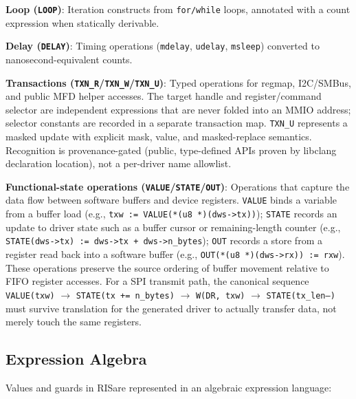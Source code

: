 \documentclass[sigplan, screen, review, anonymous]{acmart}
\newcommand{\rislang}{RIS}
\begin{document}
\textbf{Loop (\texttt{LOOP})}: Iteration constructs from \texttt{for/while} loops, annotated with a count expression when statically derivable.

\textbf{Delay (\texttt{DELAY})}: Timing operations (\texttt{mdelay}, \texttt{udelay}, \texttt{msleep}) converted to nanosecond-equivalent counts.

\textbf{Transactions (\texttt{TXN\_R}/\texttt{TXN\_W}/\texttt{TXN\_U})}: Typed operations for regmap, I2C/SMBus, and public MFD helper accesses. The target handle and register/command selector are independent expressions that are never folded into an MMIO address; selector constants are recorded in a separate transaction map. \texttt{TXN\_U} represents a masked update with explicit mask, value, and masked-replace semantics. Recognition is provenance-gated (public, type-defined APIs proven by libclang declaration location), not a per-driver name allowlist.

\textbf{Functional-state operations (\texttt{VALUE}/\texttt{STATE}/\texttt{OUT})}: Operations that capture the data flow between software buffers and device registers. \texttt{VALUE} binds a variable from a buffer load (e.g., \texttt{txw := VALUE(*(u8 *)(dws->tx))}); \texttt{STATE} records an update to driver state such as a buffer cursor or remaining-length counter (e.g., \texttt{STATE(dws->tx) := dws->tx + dws->n\_bytes}); \texttt{OUT} records a store from a register read back into a software buffer (e.g., \texttt{OUT(*(u8 *)(dws->rx)) := rxw}). These operations preserve the source ordering of buffer movement relative to FIFO register accesses. For a SPI transmit path, the canonical sequence \texttt{VALUE(txw)} $\rightarrow$ \texttt{STATE(tx += n\_bytes)} $\rightarrow$ \texttt{W(DR, txw)} $\rightarrow$ \texttt{STATE(tx\_len--)} must survive translation for the generated driver to actually transfer data, not merely touch the same registers.

\subsection{Expression Algebra}

Values and guards in \rislang are represented in an algebraic expression language:

\begin{center}
\end{center}
\end{document}
